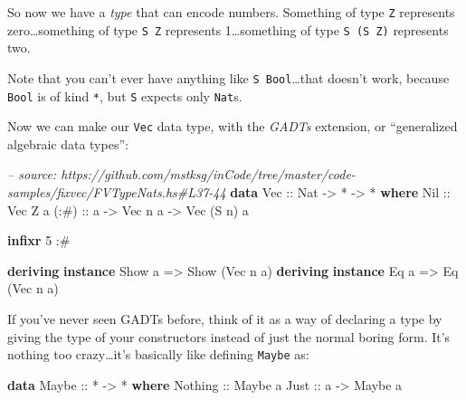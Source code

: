 \documentclass[]{article}
\newenvironment{Shaded}{}{}
\newcommand{\KeywordTok}[1]{\textcolor[rgb]{0.00,0.44,0.13}{\textbf{#1}}}
\newcommand{\DataTypeTok}[1]{\textcolor[rgb]{0.56,0.13,0.00}{#1}}
\newcommand{\DecValTok}[1]{\textcolor[rgb]{0.25,0.63,0.44}{#1}}
\newcommand{\CommentTok}[1]{\textcolor[rgb]{0.38,0.63,0.69}{\textit{#1}}}
\newcommand{\OtherTok}[1]{\textcolor[rgb]{0.00,0.44,0.13}{#1}}
\newcommand{\FunctionTok}[1]{\textcolor[rgb]{0.02,0.16,0.49}{#1}}
\newcommand{\NormalTok}[1]{#1}
\begin{document}
So now we have a \emph{type} that can encode numbers. Something of type
\texttt{Z} represents zero\ldots{}something of type \texttt{S\ Z} represents
1\ldots{}something of type \texttt{S\ (S\ Z)} represents two.

Note that you can't ever have anything like \texttt{S\ Bool}\ldots{}that doesn't
work, because \texttt{Bool} is of kind \texttt{*}, but \texttt{S} expects only
\texttt{Nat}s.

Now we can make our \texttt{Vec} data type, with the \emph{GADTs} extension, or
``generalized algebraic data types'':

\begin{Shaded}
\begin{Highlighting}[]
\CommentTok{-- source: https://github.com/mstksg/inCode/tree/master/code-samples/fixvec/FVTypeNats.hs#L37-44}
\KeywordTok{data} \DataTypeTok{Vec}\OtherTok{ ::} \DataTypeTok{Nat} \OtherTok{->} \FunctionTok{*} \OtherTok{->} \FunctionTok{*} \KeywordTok{where}
    \DataTypeTok{Nil}\OtherTok{  ::} \DataTypeTok{Vec} \DataTypeTok{Z}\NormalTok{ a}
\OtherTok{    (:#) ::}\NormalTok{ a }\OtherTok{->} \DataTypeTok{Vec}\NormalTok{ n a }\OtherTok{->} \DataTypeTok{Vec}\NormalTok{ (}\DataTypeTok{S}\NormalTok{ n) a}

\KeywordTok{infixr} \DecValTok{5} \FunctionTok{:#}

\KeywordTok{deriving} \KeywordTok{instance} \DataTypeTok{Show}\NormalTok{ a }\OtherTok{=>} \DataTypeTok{Show}\NormalTok{ (}\DataTypeTok{Vec}\NormalTok{ n a)}
\KeywordTok{deriving} \KeywordTok{instance} \DataTypeTok{Eq}\NormalTok{ a }\OtherTok{=>} \DataTypeTok{Eq}\NormalTok{ (}\DataTypeTok{Vec}\NormalTok{ n a)}
\end{Highlighting}
\end{Shaded}

If you've never seen GADTs before, think of it as a way of declaring a type by
giving the type of your constructors instead of just the normal boring form.
It's nothing too crazy\ldots{}it's basically like defining \texttt{Maybe} as:

\begin{Shaded}
\begin{Highlighting}[]
\KeywordTok{data} \DataTypeTok{Maybe}\OtherTok{ ::} \FunctionTok{*} \OtherTok{->} \FunctionTok{*} \KeywordTok{where}
    \DataTypeTok{Nothing}\OtherTok{ ::} \DataTypeTok{Maybe}\NormalTok{ a}
    \DataTypeTok{Just}\OtherTok{    ::}\NormalTok{ a }\OtherTok{->} \DataTypeTok{Maybe}\NormalTok{ a}
\end{Highlighting}
\end{Shaded}
\end{document}
